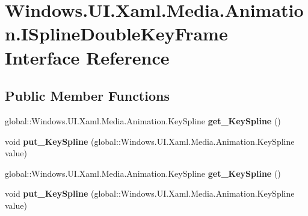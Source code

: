 \hypertarget{interface_windows_1_1_u_i_1_1_xaml_1_1_media_1_1_animation_1_1_i_spline_double_key_frame}{}\section{Windows.\+U\+I.\+Xaml.\+Media.\+Animation.\+I\+Spline\+Double\+Key\+Frame Interface Reference}
\label{interface_windows_1_1_u_i_1_1_xaml_1_1_media_1_1_animation_1_1_i_spline_double_key_frame}
\subsection*{Public Member Functions}
\begin{DoxyCompactItemize}
\item 
\mbox{\label{interface_windows_1_1_u_i_1_1_xaml_1_1_media_1_1_animation_1_1_i_spline_double_key_frame_aee332ff2916f272429ecd7f6fc5770c9}} 
global\+::\+Windows.\+U\+I.\+Xaml.\+Media.\+Animation.\+Key\+Spline {\bfseries get\+\_\+\+Key\+Spline} ()
\item 
\mbox{\label{interface_windows_1_1_u_i_1_1_xaml_1_1_media_1_1_animation_1_1_i_spline_double_key_frame_a4087bb722a940f2afe1d67aba5809f5e}} 
void {\bfseries put\+\_\+\+Key\+Spline} (global\+::\+Windows.\+U\+I.\+Xaml.\+Media.\+Animation.\+Key\+Spline value)
\item 
\mbox{\label{interface_windows_1_1_u_i_1_1_xaml_1_1_media_1_1_animation_1_1_i_spline_double_key_frame_aee332ff2916f272429ecd7f6fc5770c9}} 
global\+::\+Windows.\+U\+I.\+Xaml.\+Media.\+Animation.\+Key\+Spline {\bfseries get\+\_\+\+Key\+Spline} ()
\item 
\mbox{\label{interface_windows_1_1_u_i_1_1_xaml_1_1_media_1_1_animation_1_1_i_spline_double_key_frame_a4087bb722a940f2afe1d67aba5809f5e}} 
void {\bfseries put\+\_\+\+Key\+Spline} (global\+::\+Windows.\+U\+I.\+Xaml.\+Media.\+Animation.\+Key\+Spline value)

\end{DoxyCompactItemize}
